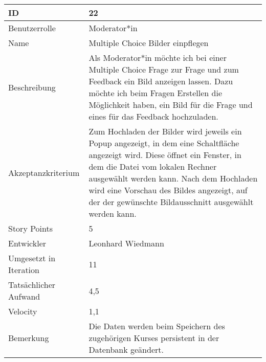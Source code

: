 \begin{tabularx}{\textwidth}{|p{}|X|}
	\hline
	ID & 22\\
	\hline
	Benutzerrolle & Moderator*in\\
	\hline
	Name & Multiple Choice Bilder einpflegen\\
	\hline
	Beschreibung & Als Moderator*in möchte ich bei einer Multiple Choice Frage zur Frage und zum Feedback ein Bild anzeigen lassen. Dazu möchte ich beim Fragen Erstellen die Möglichkeit haben, ein Bild für die Frage und eines für das Feedback hochzuladen. \\
	\hline
	Akzeptanzkriterium & Zum Hochladen der Bilder wird jeweils ein Popup angezeigt, in dem eine Schaltfläche angezeigt wird. Diese öffnet ein Fenster, in dem die Datei vom lokalen Rechner ausgewählt werden kann. Nach dem Hochladen wird eine Vorschau des Bildes angezeigt, auf der der gewünschte Bildausschnitt ausgewählt werden kann.\\
	\hline
	Story Points & 5 \\
	\hline
	Entwickler &  Leonhard Wiedmann\\
	\hline
	Umgesetzt in Iteration & 11\\
	\hline
	Tatsächlicher Aufwand & 4,5\\
	\hline
	Velocity & 1,1\\
	\hline
	Bemerkung & Die Daten werden beim Speichern des zugehörigen Kurses persistent in der Datenbank geändert.\\
	\hline
\end{tabularx}
\vspace{20pt}

